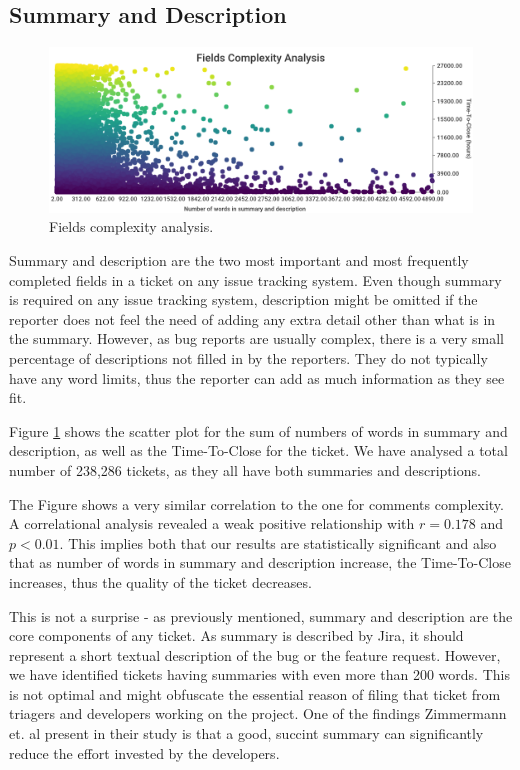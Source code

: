 \documentclass{mpaper}
\begin{document}
\subsection{Summary and Description}

\begin{figure}[ht]
  \begin{center}
    \includegraphics[scale=0.23]{images/fields_complexity.png}
  \end{center}
  \caption{\label{fields}Fields complexity analysis.}
\end{figure}

Summary and description are the two most important and most frequently completed fields in a ticket on any
issue tracking system. Even though summary is required on any issue tracking system, description might 
be omitted if the reporter does not feel the need of adding any extra detail other than what is in the summary. 
However, as bug reports are usually complex, there is a very small percentage of descriptions not filled in 
by the reporters. They do not typically have any word limits, thus the reporter can add as much information as 
they see fit.

Figure \ref{fields} shows the scatter plot for the sum of numbers of words in summary and description, as well 
as the Time-To-Close for the ticket. We have analysed a total number of 238,286 tickets, as they all have both 
summaries and descriptions.

The Figure shows a very similar correlation to the one for comments complexity. A correlational analysis revealed 
a weak positive relationship with $r = 0.178$ and $p < 0.01$. This implies both that our results are statistically 
significant and also that as number of words in summary and description increase, the Time-To-Close increases, thus 
the quality of the ticket decreases.

This is not a surprise - as previously mentioned, summary and description are the core components of any ticket. 
As summary is described by Jira, it should represent a short textual description of the bug or the feature request. However,
we have identified tickets having summaries with even more than 200 words. This is not optimal and might obfuscate
the essential reason of filing that ticket from triagers and developers working on the project. One of the findings 
Zimmermann et. al \cite{zimmermann2010makes} present in their study is that a good, succint summary can significantly 
reduce the effort invested by the developers. 
\end{document}
